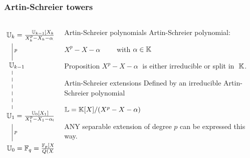 \documentclass[10pt,usepdftitle=false]{beamer}
\begin{document}

\begin{frame}
  \frametitle{Artin-Schreier towers}

  \begin{columns}
    \begin{column}{0.3\textwidth}
      \Large\[\xymatrix{
        *+[r]{\U_k = \frac{\U_{k-1}[X_k]}{X_k^p-X_k-\alpha_{k-1}}}\ar@{-}[d]^p\\
        *+[r]{\U_{k-1}} \ar@{--}[dd]\\
        \\
        *+[r]{\U_{1} = \frac{\U_0[X_1]}{X_1^p-X_1-\alpha_0}} \ar@{-}[d]^p\\
        *+[r]{\U_{0} = \F_q = \frac{\F_p[X_0]}{Q(X_0)}}
      }\]
    \end{column}
    \begin{column}{0.65\textwidth}
      \begin{block}{Artin-Schreier polynomials}
        Artin-Schreier polynomial: 
        \begin{center}
          \emph{\large$X^p - X - \alpha\qquad$} with $\alpha\in\mathbb{K}$
        \end{center}
      \end{block}
      
      \begin{block}{Proposition}
        $X^p-X-\alpha\;$ is either irreducible or split in $\;\mathbb{K}$.
      \end{block}

      \begin{block}{Artin-Schreier extensions}
        Defined by an irreducible Artin-Schreier polynomial
        \begin{center}
          \large\emph{$\mathbb{L} = \mathbb{K}[X]/(X^p - X - \alpha)$}
        \end{center}
        \alert{ANY} separable extension of degree $p$ can be expressed
        this way.
      \end{block}
    \end{column}
  \end{columns}
\end{frame}

\end{document}
